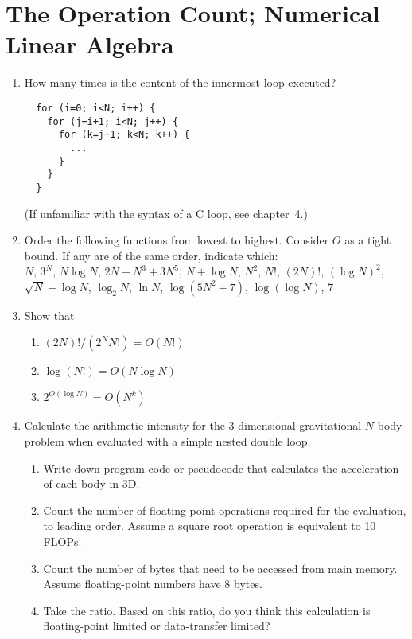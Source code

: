 \documentclass{article}
\begin{document}
\newpage
\section{The Operation Count; Numerical Linear Algebra}
\begin{enumerate}

\item
How many times is the content of the innermost loop executed?
\begin{verbatim}
  for (i=0; i<N; i++) {
    for (j=i+1; i<N; j++) {
      for (k=j+1; k<N; k++) {
        ...
      }
    }
  }
\end{verbatim}
(If unfamiliar with the syntax of a C loop, see chapter~4.)


\item 
Order the following functions from lowest to highest. Consider $O$ as a tight bound. If any are of the same order, indicate which:\\
$N$,  $3^N$, $N\log N$, 
$2N-N^3 +3N^5$, $N +\log N$, $N^2$,  $N!$, $(2N)!$, 
$(\log N)^2$, $\sqrt{N} + \log N$, $\log_2 N$, $\ln N$, 
$\log (5N^2+7)$, $\log(\log N)$, $7$


\item Show that
  \begin{enumerate} \setlength{\itemsep}{0pt}
  \item $(2N)! / (2^N N!)  = O(N!)$
  \item $\log(N!) = O(N \log N)$
  \item $2^{O(\log N)} = O(N^k)$
\end{enumerate}

  
\item {}
Calculate the arithmetic intensity for the 3-dimensional gravitational $N$-body problem when evaluated with a simple nested double loop.
\vspace{-1em}
\begin{enumerate} \setlength{\itemsep}{0pt}
\item Write down program code or pseudocode that calculates the acceleration of each body
in 3D.
\item Count the number of floating-point operations required for
the evaluation, to leading order. Assume a square root operation is equivalent to 10 FLOPs. 
\item Count the number of bytes that need to be
accessed from main memory. Assume floating-point numbers have 8 bytes. 
\item Take the ratio.
Based on this ratio, do you think this calculation is floating-point
limited or data-transfer limited?
\end{enumerate}

\end{enumerate}
\end{document}
